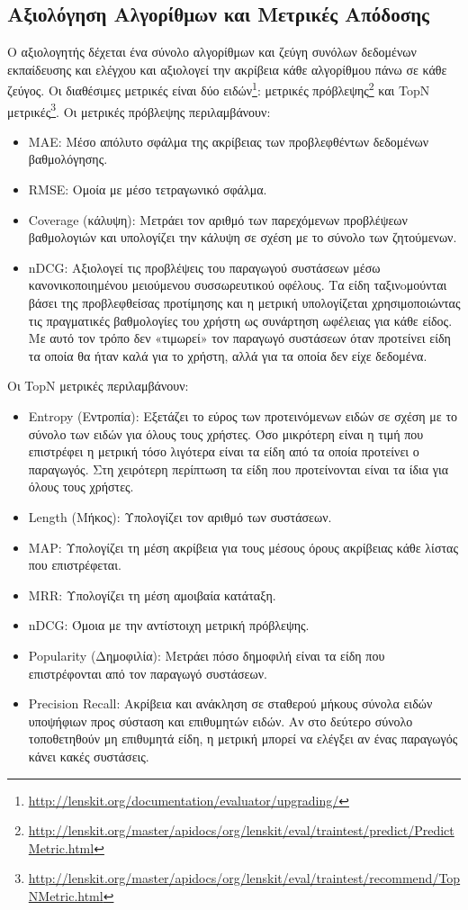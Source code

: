 \subsection{Aξιολόγηση Αλγορίθμων και Mετρικές Απόδοσης}
Ο αξιολογητής δέχεται ένα σύνολο αλγορίθμων και ζεύγη συνόλων δεδομένων εκπαίδευσης και ελέγχου και αξιολογεί την ακρίβεια κάθε αλγορίθμου πάνω σε κάθε ζεύγος. Οι διαθέσιμες μετρικές είναι δύο ειδών\footnote{\en \url{http://lenskit.org/documentation/evaluator/upgrading/}}: μετρικές πρόβλεψης\footnote{\en \url{http://lenskit.org/master/apidocs/org/lenskit/eval/traintest/predict/PredictMetric.html}} και {\en TopN} μετρικές\footnote{\en \url{http://lenskit.org/master/apidocs/org/lenskit/eval/traintest/recommend/TopNMetric.html}}. Οι μετρικές πρόβλεψης περιλαμβάνουν: 
\begin{itemize}
\item {\en MAE}: Μέσο απόλυτο σφάλμα της ακρίβειας των προβλεφθέντων δεδομένων βαθμολόγησης. 
\item {\en RMSE}: Ομοία με μέσο τετραγωνικό σφάλμα. 
\item {\en Coverage \el(κάλυψη)}: Μετράει τον αριθμό των παρεχόμενων προβλέψεων βαθμολογιών και υπολογίζει την κάλυψη σε σχέση με το σύνολο των ζητούμενων.
\item {\en nDCG}: Αξιολογεί τις προβλέψεις του παραγωγού συστάσεων μέσω κανονικοποιημένου μειούμενου συσσωρευτικού οφέλους. Τα είδη ταξινoμούνται βάσει της προβλεφθείσας προτίμησης και η μετρική υπολογίζεται χρησιμοποιώντας τις πραγματικές βαθμολογίες του χρήστη ως συνάρτηση ωφέλειας για κάθε είδος. Με αυτό τον τρόπο δεν «τιμωρεί» τον παραγωγό συστάσεων όταν προτείνει είδη τα οποία θα ήταν καλά για το χρήστη, αλλά για τα οποία δεν είχε δεδομένα.
\end{itemize}
Οι {\en TopN} μετρικές περιλαμβάνουν:
\begin{itemize}
 \item {\en Entropy} (Εντροπία): Εξετάζει το εύρος των προτεινόμενων ειδών σε σχέση με το σύνολο των ειδών για όλους τους χρήστες. Όσο μικρότερη είναι η τιμή που επιστρέφει η μετρική τόσο λιγότερα είναι τα είδη από τα οποία προτείνει ο παραγωγός. Στη χειρότερη περίπτωση τα είδη που προτείνονται είναι τα ίδια για όλους τους χρήστες.
 \item {\en Length} (Μήκος): Υπολογίζει τον αριθμό των συστάσεων. 
 \item {\en MAP}: Υπολογίζει τη μέση ακρίβεια για τους μέσους όρους ακρίβειας κάθε λίστας που επιστρέφεται.
 \item {\en MRR}: Υπολογίζει τη μέση αμοιβαία κατάταξη. 
 \item {\en nDCG}: Όμοια με την αντίστοιχη μετρική πρόβλεψης.
 \item {\en Popularity \el(Δημοφιλία)}: Μετράει πόσο δημοφιλή είναι τα είδη που επιστρέφονται από τον παραγωγό συστάσεων.
 \item {\en Precision Recall:} \el Ακρίβεια και ανάκληση σε σταθερού μήκους σύνολα ειδών υποψήφιων προς σύσταση και επιθυμητών ειδών. Αν στο δεύτερο σύνολο τοποθετηθούν μη επιθυμητά είδη, η μετρική μπορεί να ελέγξει αν ένας παραγωγός κάνει κακές συστάσεις. 
\end{itemize}
